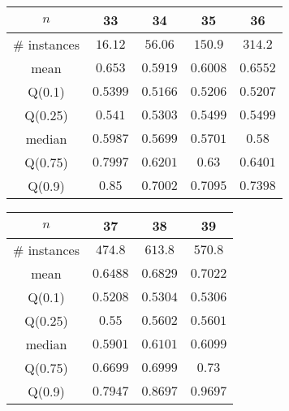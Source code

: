 \begin{tabular}{c|cccc} 
\hline 
$n$ & 33 & 34 & 35 & 36 \tabularnewline 
\hline 
\hline 
\# instances & $16.12$ & $56.06$ & $150.9$ & $314.2$ \tabularnewline 
mean & $0.653$ & $0.5919$ & $0.6008$ & $0.6552$ \tabularnewline 
Q(0.1) & $0.5399$ & $0.5166$ & $0.5206$ & $0.5207$ \tabularnewline 
Q(0.25) & $0.541$ & $0.5303$ & $0.5499$ & $0.5499$ \tabularnewline 
median & $0.5987$ & $0.5699$ & $0.5701$ & $0.58$ \tabularnewline 
Q(0.75) & $0.7997$ & $0.6201$ & $0.63$ & $0.6401$ \tabularnewline 
Q(0.9) & $0.85$ & $0.7002$ & $0.7095$ & $0.7398$ \tabularnewline 
\hline 
\end{tabular} 
\medskip{} 

\begin{tabular}{c|ccc} 
\hline 
$n$ & 37 & 38 & 39 \tabularnewline 
\hline 
\hline 
\# instances & $474.8$ & $613.8$ & $570.8$ \tabularnewline 
mean & $0.6488$ & $0.6829$ & $0.7022$ \tabularnewline 
Q(0.1) & $0.5208$ & $0.5304$ & $0.5306$ \tabularnewline 
Q(0.25) & $0.55$ & $0.5602$ & $0.5601$ \tabularnewline 
median & $0.5901$ & $0.6101$ & $0.6099$ \tabularnewline 
Q(0.75) & $0.6699$ & $0.6999$ & $0.73$ \tabularnewline 
Q(0.9) & $0.7947$ & $0.8697$ & $0.9697$ \tabularnewline 
\hline 
\end{tabular} 
\medskip{} 

